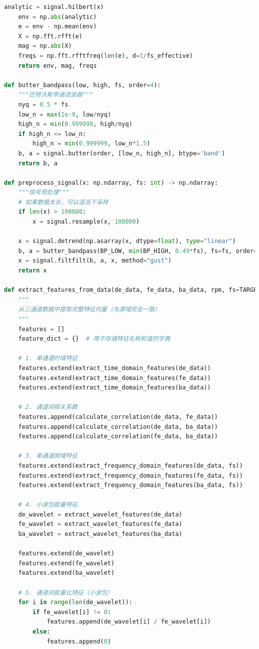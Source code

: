 \documentclass[a4paper]{CPIPC}
\numberwithin{equation}{section}
\begin{document}
\begin{lstlisting}[language=Python, caption=Target Domain Feature Extraction]
    analytic = signal.hilbert(x)
    env = np.abs(analytic)
    e = env - np.mean(env)
    X = np.fft.rfft(e)
    mag = np.abs(X)
    freqs = np.fft.rfftfreq(len(e), d=1/fs_effective)
    return env, mag, freqs

def butter_bandpass(low, high, fs, order=4):
    """巴特沃斯带通滤波器"""
    nyq = 0.5 * fs
    low_n = max(1e-9, low/nyq)
    high_n = min(0.999999, high/nyq)
    if high_n <= low_n: 
        high_n = min(0.999999, low_n*1.5)
    b, a = signal.butter(order, [low_n, high_n], btype='band')
    return b, a

def preprocess_signal(x: np.ndarray, fs: int) -> np.ndarray:
    """信号预处理"""
    # 如果数据太长，可以适当下采样
    if len(x) > 100000:
        x = signal.resample(x, 100000)
    
    x = signal.detrend(np.asarray(x, dtype=float), type="linear")
    b, a = butter_bandpass(BP_LOW, min(BP_HIGH, 0.49*fs), fs=fs, order=FILTER_ORDER)
    x = signal.filtfilt(b, a, x, method="gust")
    return x

def extract_features_from_data(de_data, fe_data, ba_data, rpm, fs=TARGET_FS):
    """
    从三通道数据中提取完整特征向量（与源域完全一致）
    """
    features = []
    feature_dict = {}  # 用于存储特征名称和值的字典
    
    # 1. 单通道时域特征
    features.extend(extract_time_domain_features(de_data))
    features.extend(extract_time_domain_features(fe_data))
    features.extend(extract_time_domain_features(ba_data))
    
    # 2. 通道间相关系数
    features.append(calculate_correlation(de_data, fe_data))
    features.append(calculate_correlation(de_data, ba_data))
    features.append(calculate_correlation(fe_data, ba_data))
    
    # 3. 单通道频域特征
    features.extend(extract_frequency_domain_features(de_data, fs))
    features.extend(extract_frequency_domain_features(fe_data, fs))
    features.extend(extract_frequency_domain_features(ba_data, fs))
    
    # 4. 小波包能量特征
    de_wavelet = extract_wavelet_features(de_data)
    fe_wavelet = extract_wavelet_features(fe_data)
    ba_wavelet = extract_wavelet_features(ba_data)
    
    features.extend(de_wavelet)
    features.extend(fe_wavelet)
    features.extend(ba_wavelet)
    
    # 5. 通道间能量比特征（小波包）
    for i in range(len(de_wavelet)):
        if fe_wavelet[i] != 0:
            features.append(de_wavelet[i] / fe_wavelet[i])
        else:
            features.append(0)
        

\end{lstlisting}
\end{document}

